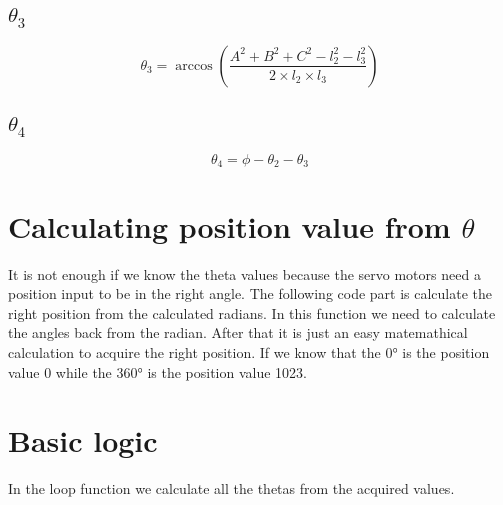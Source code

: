 			
	
		\subsection{{$\theta _3$}}
		
			\hspace{15pt}\[ \theta_3 = \arccos(\frac{A^2+B^2+C^2-l_2^2-l_3^2}{2\times l_2\times l_3}) \]
		
			
	
		\subsection{{$\theta _4$}}
		
			\hspace{15pt}\[ \theta_4 = \phi - \theta_2 - \theta_3 \]
		
			
	
	
	\section{Calculating position value from {$\theta$}}
	
		\hspace{15pt}It is not enough if we know the theta values because the servo motors need a position input to be in the right angle. The following code part is calculate the right position from the calculated radians. In this function we need to calculate the angles back from the radian. After that it is just an easy matemathical calculation to acquire the right position. If we know that the 0° is the position value 0 while the 360° is the position value 1023.
	
		
		
		
	\section{Basic logic}
	
		\hspace{15pt}In the loop function we calculate all the thetas from the acquired values.
		
